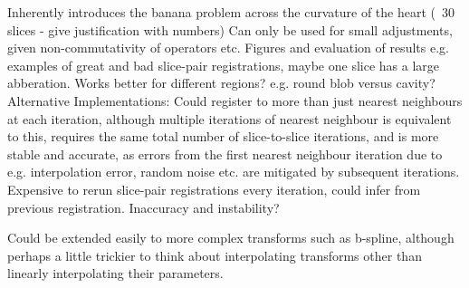   Inherently introduces the banana problem across the curvature of the heart (~30 slices - give justification with numbers)
  Can only be used for small adjustments, given non-commutativity of operators etc.
  Figures and evaluation of results e.g. examples of great and bad slice-pair registrations, maybe one slice has a large abberation. Works better for different regions? e.g. round blob versus cavity?
  Alternative Implementations:
  Could register to more than just nearest neighbours at each iteration, although multiple iterations of nearest neighbour is equivalent to this, requires the same total number of slice-to-slice iterations, and is more stable and accurate, as errors from the first nearest neighbour iteration due to e.g. interpolation error, random noise etc. are mitigated by subsequent iterations.
  Expensive to rerun slice-pair registrations every iteration, could infer from previous registration. Inaccuracy and instability?
  
  Could be extended easily to more complex transforms such as b-spline, although perhaps a little trickier to think about interpolating transforms other than linearly interpolating their parameters.



  

